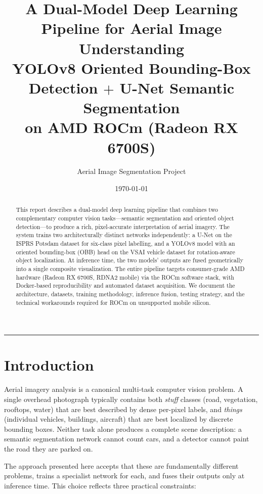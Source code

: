 \documentclass[11pt,a4paper]{article}
\title{%
  \vspace{-1.2cm}
  \Large\textbf{A Dual-Model Deep Learning Pipeline for Aerial Image Understanding} \\[0.35em]
  \normalsize YOLOv8 Oriented Bounding-Box Detection $+$ U-Net Semantic Segmentation \\[-0.25em]
  \normalsize on AMD ROCm (Radeon RX 6700S)
}
\author{Aerial Image Segmentation Project}
\date{\today}
\begin{document}
\maketitle

\vspace{-1.2em}
\begin{abstract}
\noindent
This report describes a dual-model deep learning pipeline that combines two complementary
computer vision tasks---semantic segmentation and oriented object detection---to
produce a rich, pixel-accurate interpretation of aerial imagery. The system
trains two architecturally distinct networks independently: a U-Net on the ISPRS Potsdam
dataset for six-class pixel labelling, and a YOLOv8 model with an oriented
bounding-box (OBB) head on the VSAI vehicle dataset for rotation-aware object
localization. At inference time, the two models' outputs are fused geometrically
into a single composite visualization. The entire pipeline targets consumer-grade
AMD hardware (Radeon RX 6700S, RDNA2 mobile) via the ROCm software stack, with
Docker-based reproducibility and automated dataset acquisition. We document the
architecture, datasets, training methodology, inference fusion, testing strategy,
and the technical workarounds required for ROCm on unsupported mobile silicon.
\end{abstract}

\vspace{0.5em}
\tableofcontents
\vspace{0.5em}
\hrule
\vspace{1em}

\section{Introduction}

Aerial imagery analysis is a canonical multi-task computer vision problem. A single
overhead photograph typically contains both \emph{stuff} classes (road, vegetation,
rooftops, water) that are best described by dense per-pixel labels, and \emph{things}
(individual vehicles, buildings, aircraft) that are best localized by discrete
bounding boxes. Neither task alone produces a complete scene description: a semantic
segmentation network cannot count cars, and a detector cannot paint the road they
are parked on.

The approach presented here accepts that these are fundamentally different problems,
trains a specialist network for each, and fuses their outputs only at inference time.
This choice reflects three practical constraints:
\end{document}
